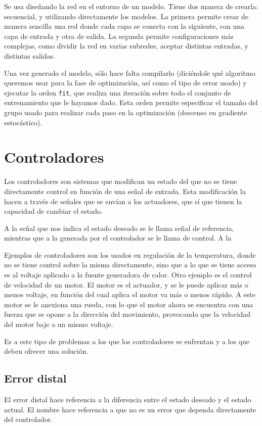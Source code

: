 Se usa diseñando la red en el entorno de un modelo. Tiene dos manera de crearla: secuencial, y utilizando directamente los modelos. La primera permite crear de manera sencilla una red donde cada capa se conecta con la siguiente, con una capa de entrada y otra de salida. La segunda permite configuraciones más complejas, como dividir la red en varias subredes, aceptar distintas entradas, y distintas salidas.

Una vez generado el modelo, sólo hace falta compilarlo (diciéndole qué algoritmo queremos usar para la fase de optimización, así como el tipo de error usado) y ejecutar la orden \texttt{fit}, que realiza una iteración sobre todo el conjunto de entrenamiento que le hayamos dado. Esta orden permite especificar el tamaño del grupo usado para realizar cada paso en la optimización (descenso en gradiente estocástico).
\section{Controladores}
Los controladores \cite{kulakowski2007dynamic}\cite{brosilow2002techniques}\cite{tolu2013adaptive}\cite{tolu2012bio} son sistemas que modifican un estado del que no se tiene directamente control en función de una señal de entrada. Esta modificación la hacen a través de señales que se envían a los actuadores, que sí que tienen la capacidad de cambiar el estado.

A la señal que nos indica el estado deseado se le llama señal de referencia, mientras que a la generada por el controlador se le llama de control. A la 

Ejemplos de controladores son los usados en regulación de la temperatura, donde no se tiene control sobre la misma directamente, sino que a lo que se tiene acceso es al voltaje aplicado a la fuente generadora de calor. Otro ejemplo es el control de velocidad de un motor. El motor es el actuador, y se le puede aplicar más o menos voltaje, en función del cual aplica el motor va más o menos rápido. A este motor se le anexiona una rueda, con lo que el motor ahora se encuentra con una fuerza que se opone a la dirección del movimiento, provocando que la velocidad del motor baje a un mismo voltaje.

Es a este tipo de problemas a los que los controladores se enfrentan y a los que deben ofrecer una solución.

\subsection{Error distal}
El error distal hace referencia a la diferencia entre el estado deseado y el estado actual. El nombre hace referencia a que no es un error que dependa directamente del controlador.
